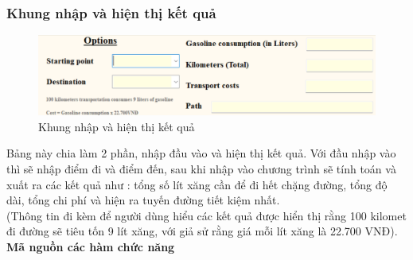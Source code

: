 \documentclass[a4paper]{article}
\begin{document}
\subsubsection{Khung nhập và hiện thị kết quả}
\begin{figure}[!ht]
    \centering
    \includegraphics[width=17cm]{3.3.png}
    \caption{Khung nhập và hiện thị kết quả}
\end{figure}
Bảng này chia làm 2 phần, nhập đầu vào và hiện thị kết quả. Với đầu nhập vào thì sẽ nhập điểm đi và điểm đến, sau khi nhập vào chương trình sẽ tính toán và xuất ra các kết quả như : tổng số lít xăng cần để đi hết chặng đường, tổng độ dài, tổng chi phí và hiện ra tuyến đường tiết kiệm nhất.\\
(Thông tin đi kèm để người dùng hiểu các kết quả được hiển thị rằng 100 kilomet đi đường sẽ tiêu tốn 9 lít xăng, với giả sử rằng giá mỗi lít xăng là 22.700 VNĐ).\\
\textbf{Mã nguồn các hàm chức năng}
\end{document}
